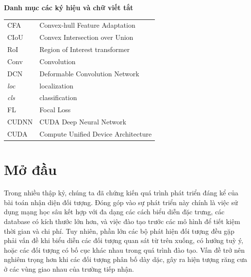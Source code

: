 \documentclass[12pt,a4paper,openany,oneside]{report}
\begin{document}



\newpage 
{} 

\listoffigures


\newpage 
{} 
\listoftables

	\newpage
{}

\begin{center}
	{\LARGE
		{\bf Danh mục các ký hiệu và chữ viết tắt}}
\end{center}
\vspace{1.25cm}
{\fontsize{13}{13}\selectfont
	\begin{tabular}{ll}
  CFA &  Convex-hull Feature Adaptation\\
  CIoU & Convex Intersection over Union\\
  RoI & Region of Interest transformer\\
  Conv & Convolution\\
  DCN & Deformable Convolution Network\\
  \textit{loc} & localization\\
  \textit{cls} & classification\\
  FL & Focal Loss\\
  CUDNN & CUDA Deep Neural Network\\
  CUDA & Compute Unified Device Architecture
	\end{tabular}
}
\newpage
{} 
\pagestyle{fancy} 

\chapter*{Mở đầu}

Trong nhiều thập kỷ, chúng ta đã chứng kiến quá trình phát triển đáng kể của bài toán nhận diện đối tượng. Đóng góp vào sự phát triển này chính là việc sử dụng mạng học sâu kết hợp với đa dạng các cách biểu diễn đặc trưng, các database có kích thước lớn hơn, và việc đào tạo trước các mô hình để tiết kiệm thời gian và chi phí. Tuy nhiên, phần lớn các bộ phát hiện đối tượng đều gặp phải vấn đề khi biểu diễn các đối tượng quan sát từ trên xuống, có hướng tuỳ ý, hoặc các đối tượng có bố cục khác nhau trong quá trình đào tạo. Vấn đề trở nên nghiêm trọng hơn khi các đối tượng phân bố dày dặc, gây ra hiện tượng răng cưa ở các vùng giao nhau của trường tiếp nhận.
\end{document}
